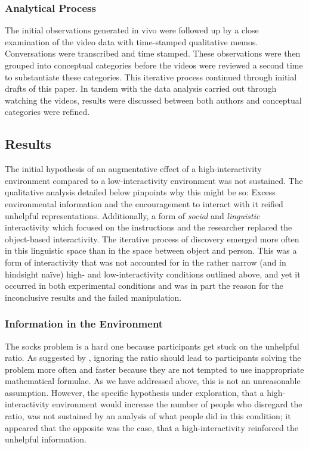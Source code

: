 \documentclass{article}
\begin{document}
\subsubsection{Analytical Process}

The initial observations generated in vivo were followed up by a close examination of the video data with time-stamped qualitative memos. Conversations were transcribed and time stamped. These observations were then grouped into conceptual categories before the videos were reviewed a second time to substantiate these categories. This iterative process continued through initial drafts of this paper. In tandem with the data analysis carried out through watching the videos, results were discussed between both authors and conceptual categories were refined. 

\subsection{Results}

The initial hypothesis of an augmentative effect of a high-interactivity environment compared to a low-interactivity environment was not sustained. The qualitative analysis detailed below pinpoints why this might be so: Excess environmental information and the encouragement to interact with it reified unhelpful representations. Additionally, a form of \emph{social} and \emph{linguistic} interactivity which focused on the instructions and the researcher replaced the object-based interactivity. The iterative process of discovery emerged more often in this linguistic space than in the space between object and person. This was a form of interactivity that was not accounted for in the rather narrow (and in hindsight naïve) high- and low-interactivity conditions outlined above, and yet it occurred in both experimental conditions and was in part the reason for the inconclusive results and the failed manipulation. 

\subsubsection{Information in the Environment}

The socks problem is a hard one because participants get stuck on the unhelpful ratio. As suggested by \parencite{Vallée-Tourangeau2020a}, ignoring the ratio should lead to participants solving the problem more often and faster because they are not tempted to use inappropriate mathematical formulae. As we have addressed above, this is not an unreasonable assumption. However, the specific hypothesis under exploration, that a high-interactivity environment would increase the number of people who disregard the ratio, was not sustained by an analysis of what people did in this condition; it appeared that the opposite was the case, that a high-interactivity reinforced the unhelpful information. 
\end{document}
